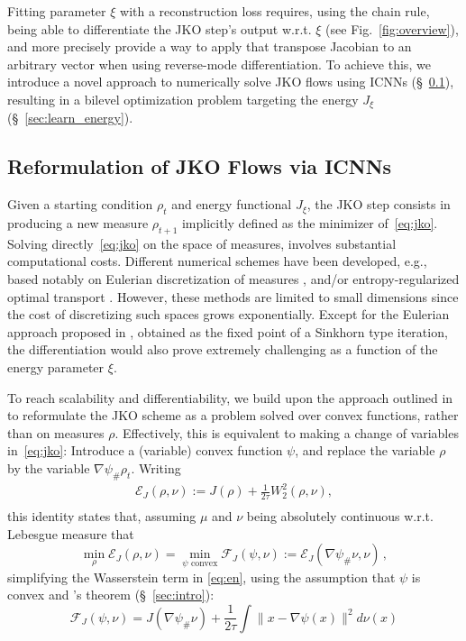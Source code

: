 Fitting parameter $\xi$ with a reconstruction loss requires, using the chain rule, being able to differentiate the JKO step's output w.r.t. $\xi$ (see Fig.~\ref{fig:overview}), and more precisely provide a way to apply that transpose Jacobian to an arbitrary vector when using reverse-mode differentiation. To achieve this, we introduce a novel approach to numerically solve JKO flows using ICNNs (\S~\ref{sec:jko_icnn}), resulting in a bilevel optimization problem targeting the energy $J_\xi$ (\S~\ref{sec:learn_energy}).

\subsection{Reformulation of JKO Flows via ICNNs} \label{sec:jko_icnn}
Given a starting condition $\rho_t$ and energy functional $J_\xi$, the JKO step consists in producing a new measure $\rho_{t+1}$ implicitly defined as the minimizer of~\eqref{eq:jko}. Solving directly~\eqref{eq:jko} on the space of measures, involves substantial computational costs. Different numerical schemes have been developed, e.g., based notably on Eulerian discretization of measures \citep{carrillo2021primal, benamou2016}, and/or entropy-regularized optimal transport \citep{peyre2015entropic}. However, these methods are limited to small dimensions since the cost of discretizing such spaces grows exponentially. Except for the Eulerian approach proposed in \citep{peyre2015entropic}, obtained as the fixed point of a Sinkhorn type iteration, the differentiation would also prove extremely challenging as a function of the energy parameter $\xi$.

 To reach scalability and differentiability, we build upon the approach outlined in \citet{benamou2016} to reformulate the JKO scheme as a problem solved over convex functions, rather than on measures $\rho$. Effectively, this is equivalent to making a change of variables in~\eqref{eq:jko}: Introduce a (variable) convex function $\psi$, and replace the variable $\rho$ by the variable $\nabla \psi_{\#}\rho_t$. Writing
\begin{equation}\label{eq:en}
\begin{split}
\mathcal{E}_J(\rho, \nu) := J(\rho) +\frac{1}{2 \tau}W_2^2(\rho, \nu),\\
\end{split}
\end{equation}
this identity states that, assuming $\mu$ and $\nu$ being absolutely continuous w.r.t. Lebesgue measure that
$$\min_{\rho}\mathcal{E}_J(\rho,\nu) = \min_{\psi \text{ convex}} \mathcal{F}_J(\psi, \nu):= \mathcal{E}_J(\nabla \psi_{\#}\nu, \nu)\,,$$
simplifying the Wasserstein term in \eqref{eq:en}, using the assumption that $\psi$ is convex and \citeauthor{Brenier1987}'s theorem (\S~\ref{sec:intro}):
\begin{equation}\mathcal{F}_J(\psi, \nu) = J(\nabla \psi_{\#}\nu) +\frac{1}{2 \tau} \!\! \int\!\! \| x - \nabla \psi(x) \|^2 d \nu(x)\label{eq:JKO_psi}
\end{equation}

